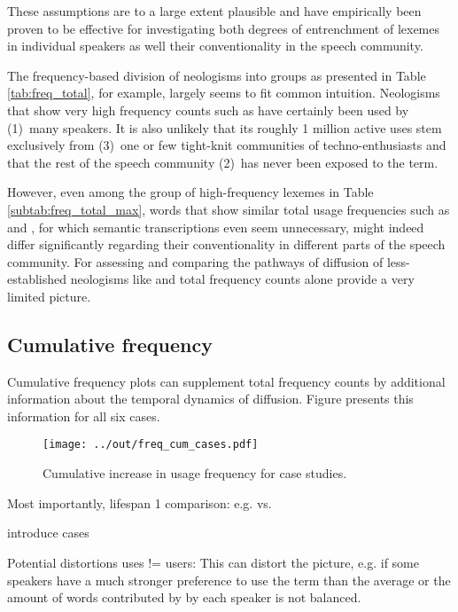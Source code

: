 \documentclass[draft, a4paper, abstract=on]{scrartcl}
\begin{document}
  These assumptions are to a large extent plausible and have empirically been proven to be effective for investigating both degrees of entrenchment of lexemes in individual speakers as well their conventionality in the speech community.

  The frequency-based division of neologisms into groups as presented in Table \ref{tab:freq_total}, for example, largely seems to fit common intuition. Neologisms that show very high frequency counts such as  have certainly been used by (1)~many speakers. It is also unlikely that its roughly 1 million active uses stem exclusively from (3)~one or few tight-knit communities of techno-enthusiasts and that the rest of the speech community (2)~has never been exposed to the term.

  However, even among the group of high-frequency lexemes in Table \ref{subtab:freq_total_max}, words that show similar total usage frequencies such as  and , for which semantic transcriptions even seem unnecessary, might indeed differ significantly regarding their conventionality in different parts of the speech community. For assessing and comparing the pathways of diffusion of less-established neologisms like  and  total frequency counts alone provide a very limited picture.

  \subsection{Cumulative frequency}

  Cumulative frequency plots can supplement total frequency counts by additional information about the temporal dynamics of diffusion. Figure presents this information for all six cases.

  \begin{figure}
  \caption{Cumulative increase in usage frequency for case studies.\protect\footnotemark}
  \label{fig:freq_cum_cases}
  \texttt{[image: ../out/freq\_cum\_cases.pdf]}
  \centering
  \end{figure}

  Most importantly,
  lifespan
  1 comparison: e.g.  vs. 

  introduce cases


  Potential distortions
  uses != users: This can distort the picture, e.g. if some speakers have a much stronger preference to use the term than the average or the amount of words contributed by by each speaker is not balanced.
\end{document}
